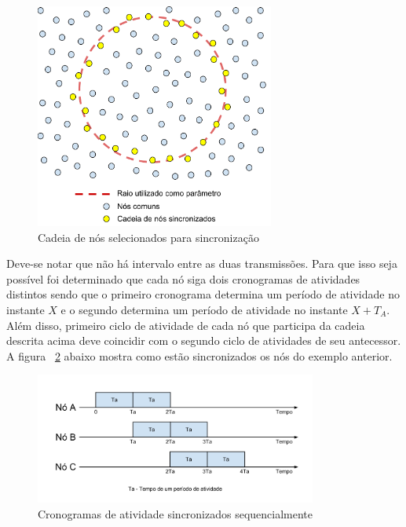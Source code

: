 \begin{figure}[!htb]
\centering
\includegraphics[width=297px,height=280px]{./Pictures/CircularBackbone.png}
\caption{Cadeia de nós selecionados para sincronização} %
\label{fig:circularBackbone} %
\end{figure}

Deve-se notar que não há intervalo entre as duas transmissões. Para que isso seja possível foi determinado que cada nó siga dois cronogramas de atividades distintos sendo que o primeiro cronograma determina um período de atividade no instante $X$ e o segundo determina um período de atividade no instante $X + T_A$. Além disso, primeiro ciclo de atividade de cada nó que participa da cadeia descrita acima deve coincidir com o segundo ciclo de atividades de seu antecessor. A figura ~\ref{fig:backboneSynchronization} abaixo mostra como estão sincronizados os nós do exemplo anterior.

\begin{figure}[!htb]
\centering
\includegraphics[width=350px,height=163px]{./Pictures/SequencialSynchronization.png}
\caption{Cronogramas de atividade sincronizados sequencialmente} %
\label{fig:backboneSynchronization} %
\end{figure}

